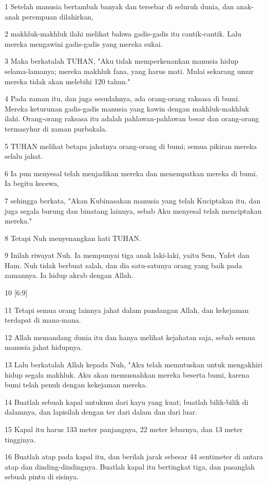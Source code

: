 \par 1 Setelah manusia bertambah banyak dan tersebar di seluruh dunia, dan anak-anak perempuan dilahirkan,
\par 2 makhluk-makhluk ilahi melihat bahwa gadis-gadis itu cantik-cantik. Lalu mereka mengawini gadis-gadis yang mereka sukai.
\par 3 Maka berkatalah TUHAN, "Aku tidak memperkenankan manusia hidup selama-lamanya; mereka makhluk fana, yang harus mati. Mulai sekarang umur mereka tidak akan melebihi 120 tahun."
\par 4 Pada zaman itu, dan juga sesudahnya, ada orang-orang raksasa di bumi. Mereka keturunan gadis-gadis manusia yang kawin dengan makhluk-makhluk ilahi. Orang-orang raksasa itu adalah pahlawan-pahlawan besar dan orang-orang termasyhur di zaman purbakala.
\par 5 TUHAN melihat betapa jahatnya orang-orang di bumi; semua pikiran mereka selalu jahat.
\par 6 Ia pun menyesal telah menjadikan mereka dan menempatkan mereka di bumi. Ia begitu kecewa,
\par 7 sehingga berkata, "Akan Kubinasakan manusia yang telah Kuciptakan itu, dan juga segala burung dan binatang lainnya, sebab Aku menyesal telah menciptakan mereka."
\par 8 Tetapi Nuh menyenangkan hati TUHAN.
\par 9 Inilah riwayat Nuh. Ia mempunyai tiga anak laki-laki, yaitu Sem, Yafet dan Ham. Nuh tidak berbuat salah, dan dia satu-satunya orang yang baik pada zamannya. Ia hidup akrab dengan Allah.
\par 10 [6:9]
\par 11 Tetapi semua orang lainnya jahat dalam pandangan Allah, dan kekejaman terdapat di mana-mana.
\par 12 Allah memandang dunia itu dan hanya melihat kejahatan saja, sebab semua manusia jahat hidupnya.
\par 13 Lalu berkatalah Allah kepada Nuh, "Aku telah memutuskan untuk mengakhiri hidup segala makhluk. Aku akan memusnahkan mereka beserta bumi, karena bumi telah penuh dengan kekejaman mereka.
\par 14 Buatlah sebuah kapal untukmu dari kayu yang kuat; buatlah bilik-bilik di dalamnya, dan lapisilah dengan ter dari dalam dan dari luar.
\par 15 Kapal itu harus 133 meter panjangnya, 22 meter lebarnya, dan 13 meter tingginya.
\par 16 Buatlah atap pada kapal itu, dan berilah jarak sebesar 44 sentimeter di antara atap dan dinding-dindingnya. Buatlah kapal itu bertingkat tiga, dan pasanglah sebuah pintu di sisinya.
